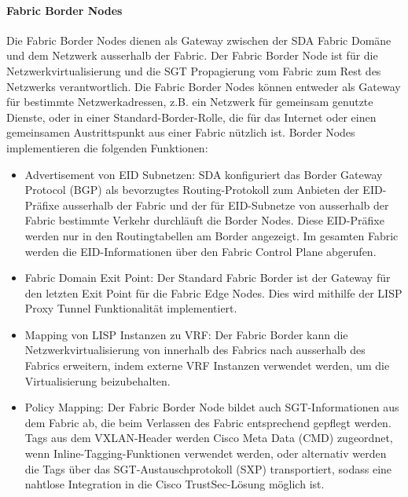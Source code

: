 \paragraph{Fabric Border Nodes}
Die Fabric Border Nodes dienen als Gateway zwischen der SDA Fabric Domäne und dem Netzwerk ausserhalb der Fabric. Der Fabric Border Node ist für die Netzwerkvirtualisierung und die SGT Propagierung vom Fabric zum Rest des Netzwerks verantwortlich. Die Fabric Border Nodes können entweder als Gateway für bestimmte Netzwerkadressen, z.B. ein Netzwerk für gemeinsam genutzte Dienste, oder in einer Standard-Border-Rolle, die für das Internet oder einen gemeinsamen Austrittspunkt aus einer Fabric nützlich ist. Border Nodes implementieren die folgenden Funktionen: \cite{sda-designguide}
\begin{itemize}	
	\item Advertisement von EID Subnetzen: SDA konfiguriert das Border Gateway Protocol (BGP) als bevorzugtes Routing-Protokoll zum Anbieten der EID-Präfixe ausserhalb der Fabric und der für EID-Subnetze von ausserhalb der Fabric bestimmte Verkehr durchläuft die Border Nodes. Diese EID-Präfixe werden nur in den Routingtabellen am Border angezeigt. Im gesamten Fabric werden die EID-Informationen über den Fabric Control Plane abgerufen.
	\item Fabric Domain Exit Point: Der Standard Fabric Border ist der Gateway für den letzten Exit Point für die Fabric Edge Nodes. Dies wird mithilfe der LISP Proxy Tunnel Funktionalität implementiert.
	\item Mapping von LISP Instanzen zu VRF: Der Fabric Border kann die Netzwerkvirtualisierung von innerhalb des Fabrics nach ausserhalb des Fabrics erweitern, indem externe VRF Instanzen verwendet werden, um die Virtualisierung beizubehalten.
	\item Policy Mapping: Der Fabric Border Node bildet auch SGT-Informationen aus dem Fabric ab, die beim Verlassen des Fabric entsprechend gepflegt werden. Tags aus dem VXLAN-Header werden Cisco Meta Data (CMD) zugeordnet, wenn Inline-Tagging-Funktionen verwendet werden, oder alternativ werden die Tags über das SGT-Austauschprotokoll (SXP) transportiert, sodass eine nahtlose Integration in die Cisco TrustSec-Lösung möglich ist.
\end{itemize}



